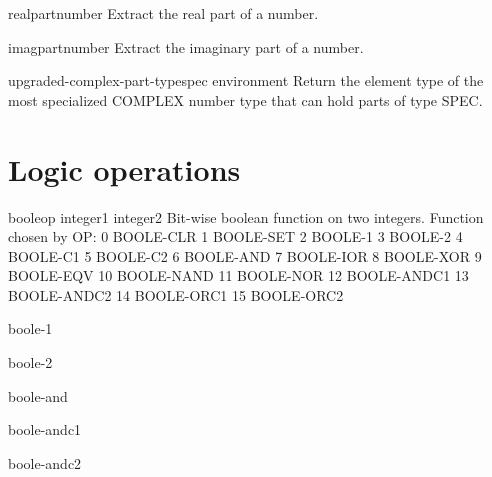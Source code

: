 \documentclass[10pt,english]{book}
\begin{document}
\begin{function}{realpart}{number}
  Extract the real part of a number.
\end{function}

\begin{function}{imagpart}{number}
  Extract the imaginary part of a number.
\end{function}

\begin{function}{upgraded-complex-part-type}{spec \op environment}
  Return the element type of the most specialized COMPLEX number type that
   can hold parts of type SPEC.
\end{function}

\section{Logic operations}
\label{sec:logic-operations}

\begin{function}{boole}{op integer1 integer2}
  Bit-wise boolean function on two integers. Function chosen by OP:
        0       BOOLE-CLR
        1       BOOLE-SET
        2       BOOLE-1
        3       BOOLE-2
        4       BOOLE-C1
        5       BOOLE-C2
        6       BOOLE-AND
        7       BOOLE-IOR
        8       BOOLE-XOR
        9       BOOLE-EQV
        10      BOOLE-NAND
        11      BOOLE-NOR
        12      BOOLE-ANDC1
        13      BOOLE-ANDC2
        14      BOOLE-ORC1
        15      BOOLE-ORC2
\end{function}

\begin{constant}{boole-1}{}
  
\end{constant}

\begin{constant}{boole-2}{}
  
\end{constant}

\begin{constant}{boole-and}{}
  
\end{constant}

\begin{constant}{boole-andc1}{}
  
\end{constant}

\begin{constant}{boole-andc2}{}
  
\end{constant}
\end{document}
